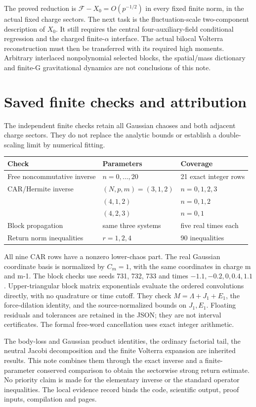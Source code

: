 \documentclass[11pt]{article}
\begin{document}
The proved reduction is $\mathcal F-X_0=O(p^{-1/2})$ in every
fixed finite norm, in the actual fixed charge sectors. The next
task is the fluctuation-scale two-component description of
$X_0$. It still requires the central four-auxiliary-field
conditional regression and the charged finite-$\alpha$ interface.
The actual bilocal Volterra reconstruction must then be
transferred with its required high moments. Arbitrary interlaced
nonpolynomial selected blocks, the spatial/mass dictionary and
finite-G gravitational dynamics are not conclusions of this note.

\newpage
\section{Saved finite checks and attribution}
The independent finite checks retain all Gaussian chaoses and
both adjacent charge sectors. They do not replace the analytic
bounds or establish a double-scaling limit by numerical fitting.
\begin{center}
\begin{tabular}{lll}\toprule
Check&Parameters&Coverage\\\midrule
Free noncommutative inverse&$n=0,\ldots,20$&21 exact integer rows\\
CAR/Hermite inverse&$(N,p,m)=(3,1,2)$&$n=0,1,2,3$\\
&$(4,1,2)$&$n=0,1,2$\\
&$(4,2,3)$&$n=0,1$\\
Block propagation&same three systems&five real times each\\
Return norm inequalities&$r=1,2,4$&90 inequalities\\\bottomrule
\end{tabular}
\end{center}
All nine CAR rows have a nonzero lower-chaos part. The real
Gaussian coordinate basis is normalized by $C_m=1$, with the
same coordinates in charge m and m-1. The block checks use
seeds 731, 732, 733 and times $-1.1,-0.2,0,0.4,1.1$.
Upper-triangular block matrix exponentials evaluate the ordered
convolutions directly, with no quadrature or time cutoff.
They check $M=\Lambda+J_1+E_1$, the force-dilation identity,
and the source-normalized bounds on $J_1,E_1$.
Floating residuals and tolerances are retained in the JSON;
they are not interval certificates. The formal free-word
cancellation uses exact integer arithmetic.

The body-loss and Gaussian product identities, the ordinary
factorial tail, the neutral Jacobi decomposition and the finite
Volterra expansion are inherited results. This note combines
them through the exact inverse and a finite-parameter conserved
comparison to obtain the sectorwise strong return estimate.
No priority claim is made for the elementary inverse or the
standard operator inequalities. The local evidence record binds
the code, scientific output, proof inputs, compilation and pages.
\end{document}
